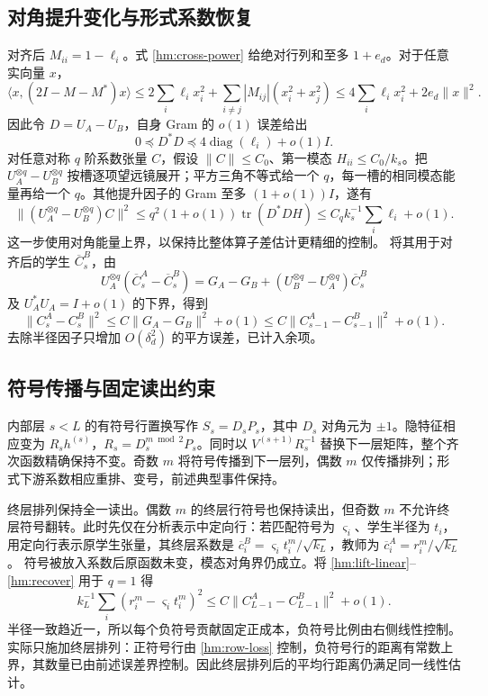 \documentclass[a4paper]{tufte-handout}
\begin{document}
\begin{fullwidth}
\subsection{对角提升变化与形式系数恢复}
对齐后 $M_{ii}=1-\ell_i$。式 \eqref{hm:cross-power} 给绝对行列和至多 $1+e_d$。对于任意实向量 $x$，
\[
 \langle x,(2I-M-M^*)x\rangle
 \le2\sum_i\ell_ix_i^2+\sum_{i\ne j}|M_{ij}|(x_i^2+x_j^2)
 \le4\sum_i\ell_ix_i^2+2e_d\|x\|^2.
\]
因此令 $D=U_A-U_B$，自身 Gram 的 $o(1)$ 误差给出
\begin{equation}\label{hm:lift-loewner}
 0\preceq D^*D\preceq4\operatorname{diag}(\ell_i)+o(1)I.
\end{equation}
对任意对称 $q$ 阶系数张量 $C$，假设 $\|C\|\le C_0$、第一模态 $H_{ii}\le C_0/k_s$。把 $U_A^{\otimes q}-U_B^{\otimes q}$ 按槽逐项望远镜展开；平方三角不等式给一个 $q$，每一槽的相同模态能量再给一个 $q$。其他提升因子的 Gram 至多 $(1+o(1))I$，遂有
\begin{equation}\label{hm:lift-linear}
 \|(U_A^{\otimes q}-U_B^{\otimes q})C\|^2
 \le q^2(1+o(1))\operatorname{tr}(D^*DH)
 \le C_q k_s^{-1}\sum_i\ell_i+o(1).
\end{equation}
这一步使用对角能量上界，以保持比整体算子差估计更精细的控制。
将其用于对齐后的学生 $\overline C_s^B$，由
\[
 U_A^{\otimes q}(\overline C_s^A-\overline C_s^B)
 =G_A-G_B+(U_B^{\otimes q}-U_A^{\otimes q})\overline C_s^B
\]
及 $U_A^*U_A=I+o(1)$ 的下界，得到
\begin{equation}\label{hm:recover}
 \|C_s^A-C_s^B\|^2\le C\|G_A-G_B\|^2+o(1)
 \le C\|C_{s-1}^A-C_{s-1}^B\|^2+o(1).
\end{equation}
去除半径因子只增加 $O(\delta_d^2)$ 的平方误差，已计入余项。

\subsection{符号传播与固定读出约束}
内部层 $s<L$ 的有符号行置换写作 $S_s=D_sP_s$，其中 $D_s$ 对角元为 $\pm1$。隐特征相应变为
$R_sh^{(s)}$，$R_s=D_s^{m\bmod2}P_s$。同时以 $V^{(s+1)}R_s^{-1}$ 替换下一层矩阵，整个齐次函数精确保持不变。奇数 $m$ 将符号传播到下一层列，偶数 $m$ 仅传播排列；形式下游系数相应重排、变号，前述典型事件保持。

终层排列保持全一读出。偶数 $m$ 的终层行符号也保持读出，但奇数 $m$ 不允许终层符号翻转。此时先仅在分析表示中定向行：若匹配符号为 $\varsigma_i$、学生半径为 $t_i$，用定向行表示原学生张量，其终层系数是
$\overline c_i^B=\varsigma_i t_i^m/\sqrt{k_L}$，教师为
$\overline c_i^A=r_i^m/\sqrt{k_L}$。
符号被放入系数后原函数未变，模态对角界仍成立。将 \eqref{hm:lift-linear}--\eqref{hm:recover} 用于 $q=1$ 得
\[
 k_L^{-1}\sum_i(r_i^m-\varsigma_i t_i^m)^2
 \le C\|C_{L-1}^A-C_{L-1}^B\|^2+o(1).
\]
半径一致趋近一，所以每个负符号贡献固定正成本，负符号比例由右侧线性控制。实际只施加终层排列：正符号行由 \eqref{hm:row-loss} 控制，负符号行的距离有常数上界，其数量已由前述误差界控制。因此终层排列后的平均行距离仍满足同一线性估计。


\end{fullwidth}
\end{document}
